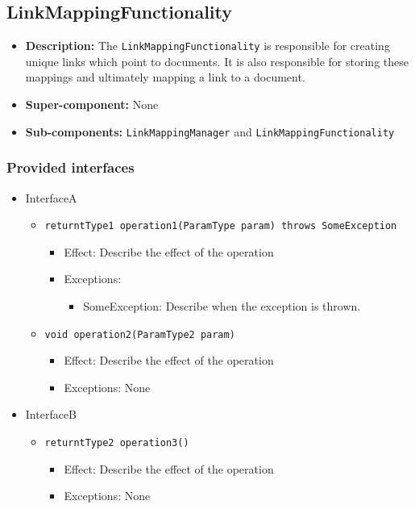 \documentclass[a4paper,10pt]{article}
\begin{document}
\subsection{LinkMappingFunctionality}
\begin{itemize}
    \item \textbf{Description:} The \texttt{LinkMappingFunctionality} is responsible for creating unique links which point to documents. It is also responsible for storing these mappings and ultimately mapping a link to a document.
    \item \textbf{Super-component:} None
    \item \textbf{Sub-components:} \texttt{LinkMappingManager} and \texttt{LinkMappingFunctionality}
\end{itemize}

\subsubsection*{Provided interfaces}
\begin{itemize}
    \item InterfaceA
    \begin{itemize}
        \item \texttt{returntType1 operation1(ParamType param) throws SomeException}
        \begin{itemize}
            \item Effect: Describe the effect of the operation
            \item Exceptions:
            \begin{itemize}
                \item SomeException: Describe when the exception is thrown.
            \end{itemize}
		\end{itemize}
        \item \texttt{void operation2(ParamType2 param)}
        \begin{itemize}
            \item Effect: Describe the effect of the operation
            \item Exceptions: None
        \end{itemize}
    \end{itemize}

    \item InterfaceB
    \begin{itemize}
        \item \texttt{returntType2 operation3()}
        \begin{itemize}
            \item Effect: Describe the effect of the operation
            \item Exceptions: None
        \end{itemize}
    \end{itemize}
\end{itemize}
\end{document}
